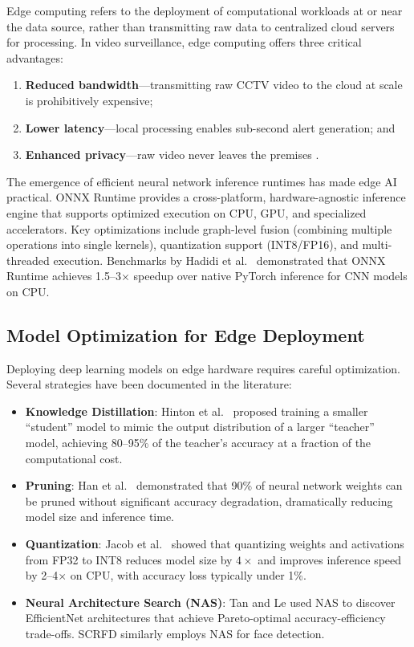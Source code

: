 \documentclass[12pt, a4paper]{article}
\begin{document}
Edge computing refers to the deployment of computational workloads at or near the data source, rather than transmitting raw data to centralized cloud servers for processing. In video surveillance, edge computing offers three critical advantages:
\begin{enumerate}[label=(\arabic*)]
    \item \textbf{Reduced bandwidth}---transmitting raw CCTV video to the cloud at scale is prohibitively expensive;
    \item \textbf{Lower latency}---local processing enables sub-second alert generation; and
    \item \textbf{Enhanced privacy}---raw video never leaves the premises \cite{shi2016edge}.
\end{enumerate}

The emergence of efficient neural network inference runtimes has made edge AI practical. ONNX Runtime \cite{microsoft2019onnx} provides a cross-platform, hardware-agnostic inference engine that supports optimized execution on CPU, GPU, and specialized accelerators. Key optimizations include graph-level fusion (combining multiple operations into single kernels), quantization support (INT8/FP16), and multi-threaded execution. Benchmarks by Hadidi et al.\ \cite{hadidi2020} demonstrated that ONNX Runtime achieves 1.5--3$\times$ speedup over native PyTorch inference for CNN models on CPU.

\subsection{Model Optimization for Edge Deployment}

Deploying deep learning models on edge hardware requires careful optimization. Several strategies have been documented in the literature:

\begin{itemize}[leftmargin=*]
    \item \textbf{Knowledge Distillation}: Hinton et al.\ \cite{hinton2015} proposed training a smaller ``student'' model to mimic the output distribution of a larger ``teacher'' model, achieving 80--95\% of the teacher's accuracy at a fraction of the computational cost.
    
    \item \textbf{Pruning}: Han et al.\ \cite{han2015} demonstrated that 90\% of neural network weights can be pruned without significant accuracy degradation, dramatically reducing model size and inference time.
    
    \item \textbf{Quantization}: Jacob et al.\ \cite{jacob2018} showed that quantizing weights and activations from FP32 to INT8 reduces model size by $4\times$ and improves inference speed by 2--4$\times$ on CPU, with accuracy loss typically under 1\%.
    
    \item \textbf{Neural Architecture Search (NAS)}: Tan and Le \cite{tan2019efficientnet} used NAS to discover EfficientNet architectures that achieve Pareto-optimal accuracy-efficiency trade-offs. SCRFD \cite{guo2022scrfd} similarly employs NAS for face detection.
\end{itemize}
\end{document}
